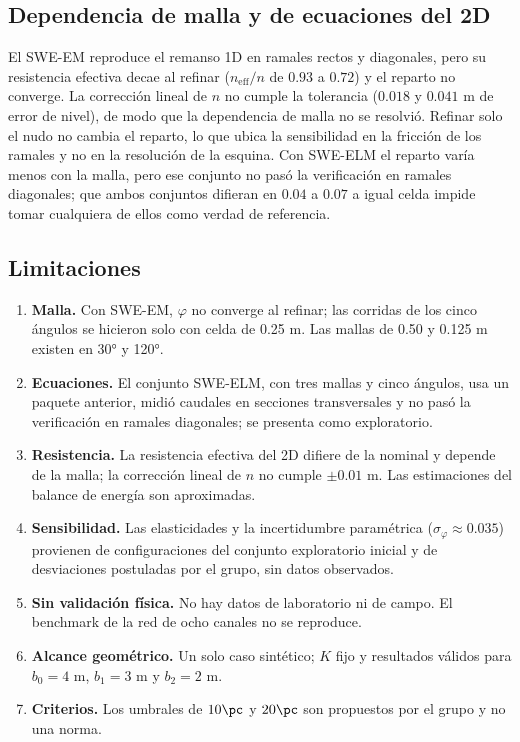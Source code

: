 \subsection{Dependencia de malla y de ecuaciones del 2D}
El SWE-EM reproduce el remanso 1D en ramales rectos y diagonales, pero su resistencia efectiva decae al refinar ($n_\mathrm{eff}/n$ de $0.93$ a $0.72$) y el reparto no converge. La corrección lineal de $n$ no cumple la tolerancia ($0.018$ y $0.041$ m de error de nivel), de modo que la dependencia de malla no se resolvió. Refinar solo el nudo no cambia el reparto, lo que ubica la sensibilidad en la fricción de los ramales y no en la resolución de la esquina. Con SWE-ELM el reparto varía menos con la malla, pero ese conjunto no pasó la verificación en ramales diagonales; que ambos conjuntos difieran en $0.04$ a $0.07$ a igual celda impide tomar cualquiera de ellos como verdad de referencia.

\subsection{Limitaciones}
\begin{enumerate}[label=\arabic*)]
\item \textbf{Malla.} Con SWE-EM, $\varphi$ no converge al refinar; las corridas de los cinco ángulos se hicieron solo con celda de 0.25 m. Las mallas de 0.50 y 0.125 m existen en 30° y 120°.
\item \textbf{Ecuaciones.} El conjunto SWE-ELM, con tres mallas y cinco ángulos, usa un paquete anterior, midió caudales en secciones transversales y no pasó la verificación en ramales diagonales; se presenta como exploratorio.
\item \textbf{Resistencia.} La resistencia efectiva del 2D difiere de la nominal y depende de la malla; la corrección lineal de $n$ no cumple $\pm0.01$ m. Las estimaciones del balance de energía son aproximadas.
\item \textbf{Sensibilidad.} Las elasticidades y la incertidumbre paramétrica ($\sigma_\varphi\approx0.035$) provienen de configuraciones del conjunto exploratorio inicial y de desviaciones postuladas por el grupo, sin datos observados.
\item \textbf{Sin validación física.} No hay datos de laboratorio ni de campo. El benchmark de la red de ocho canales no se reproduce.
\item \textbf{Alcance geométrico.} Un solo caso sintético; $K$ fijo y resultados válidos para $b_0=4$ m, $b_1=3$ m y $b_2=2$ m.
\item \textbf{Criterios.} Los umbrales de $10\pc$ y $20\pc$ son propuestos por el grupo y no una norma.
\end{enumerate}

